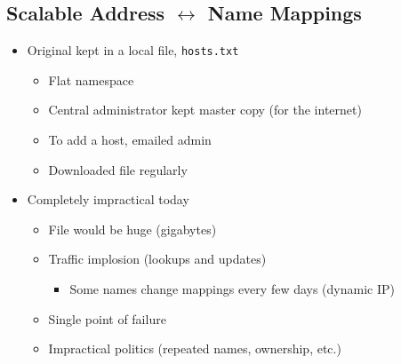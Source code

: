 \subsection{Scalable Address \texorpdfstring{$\leftrightarrow$}{<->} Name Mappings}
\begin{itemize}[nosep]
    \item Original kept in a local file, \texttt{hosts.txt}
          \begin{itemize}[nosep]
              \item Flat namespace
              \item Central administrator kept master copy (for the internet)
              \item To add a host, emailed admin
              \item Downloaded file regularly
          \end{itemize}
    \item Completely impractical today
          \begin{itemize}[nosep]
              \item File would be huge (gigabytes)
              \item Traffic implosion (lookups and updates)
                    \begin{itemize}[nosep]
                        \item Some names change mappings every few days (dynamic IP)
                    \end{itemize}
              \item Single point of failure
              \item Impractical politics (repeated names, ownership, etc.)
          \end{itemize}
\end{itemize}
